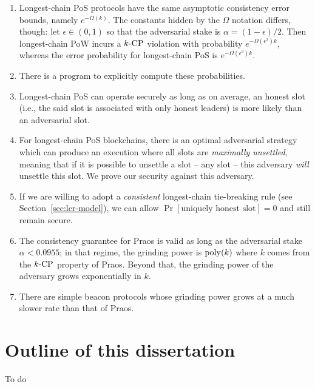 \begin{enumerate}
  \item Longest-chain PoS protocols have the same asymptotic 
  consistency error bounds, namely $e^{-\Omega(k)}$. 
  The constants hidden by the $\Omega$ notation differs, though: 
  let $\epsilon \in (0,1)$ so that 
  the adversarial stake is $\alpha = (1-\epsilon)/2$. 
  Then longest-chain PoW incurs a ${k}\text{-}\mathrm{CP}$ violation with probability $e^{-\Omega(\epsilon^2)k}$, 
  whereas the error probability for longest-chain PoS is $e^{-\Omega(\epsilon^3)k}$.

  \item There is a program to explicitly compute these probabilities.

  \item Longest-chain PoS can operate securely as long as on average, an honest slot 
  (i.e., the said slot is associated with only honest leaders) 
  is more likely than an adversarial slot.

  \item For longest-chain PoS blockchains, 
  there is an optimal adversarial strategy 
  which can produce an execution 
  where all slots are \emph{maximally unsettled}, meaning that 
  if it is possible to unsettle a slot -- any slot -- 
  this adversary \emph{will} unsettle this slot. 
  We prove our security against this adversary.

  \item If we are willing to adopt a \emph{consistent} 
  longest-chain tie-breaking rule (see Section~\ref{sec:lcr-model}), 
  we can allow $\Pr[\text{uniquely honest slot}] = 0$ 
  and still remain secure.

  \item The consistency guarantee for Praos is valid 
  as long as the adversarial stake $\alpha < 0.0955$; 
  in that regime, the grinding power is $\mathrm{poly}(k)$ 
  where $k$ comes from the ${k}\text{-}\mathrm{CP}$ property of Praos. 
  Beyond that, the grinding power of the adversary grows exponentially in $k$.

  \item There are simple beacon protocols 
  whose grinding power grows at a much slower rate than that of Praos.
\end{enumerate}




\section{Outline of this dissertation}
To do




